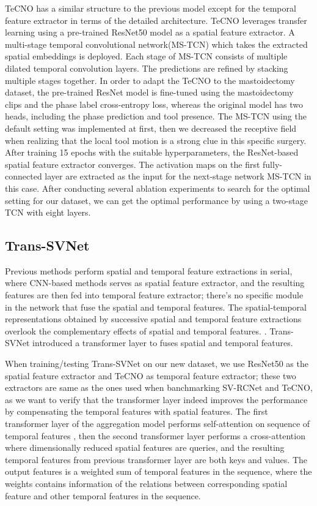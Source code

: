 \documentclass[11pt]{article} \usepackage[top=1in, bottom=1in, left=1in, right=1in]{geometry}
\begin{document}
\vspace{0.25cm}
\noindent
TeCNO has a similar structure to the previous model except for the temporal feature extractor in terms of the detailed architecture. TeCNO leverages transfer learning using a pre-trained ResNet50 model as a spatial feature extractor. A multi-stage temporal convolutional network(MS-TCN) which takes the extracted spatial embeddings is deployed. Each stage of MS-TCN consists of multiple dilated temporal convolution layers. The predictions are refined by stacking multiple stages together. In order to adapt the TeCNO to the mastoidectomy dataset, the pre-trained ResNet model is fine-tuned using the mastoidectomy clips and the phase label cross-entropy loss, whereas the original model has two heads, including the phase prediction and tool presence. The MS-TCN using the default setting was implemented at first, then we decreased the receptive field when realizing that the local tool motion is a strong clue in this specific surgery. After training 15 epochs with the suitable hyperparameters, the ResNet-based spatial feature extractor converges. The activation maps on the first fully-connected layer are extracted as the input for the next-stage network MS-TCN in this case. After conducting several ablation experiments to search for the optimal setting for our dataset, we can get the optimal performance by using a two-stage TCN with eight layers.

\subsection{Trans-SVNet}
Previous methods perform spatial and temporal feature extractions in serial, where CNN-based methods serves as spatial feature extractor, and the resulting features are then fed into temporal feature extractor; there's no specific module in the network that fuse the spatial and temporal features. The spatial-temporal representations obtained by successive spatial and temporal feature extractions overlook the complementary effects of spatial and temporal features. \cite{TransSVNet}. Trans-SVNet introduced a transformer layer to fuses spatial and temporal features.

\vspace{0.25cm}
\noindent
When training/testing Trans-SVNet on our new dataset, we use ResNet50 as the spatial feature extractor and TeCNO as temporal feature extractor; these two extractors are same as the ones used when banchmarking SV-RCNet and TeCNO, as we want to verify that the transformer layer indeed improves the performance by compensating the temporal features with spatial features. The first transformer layer of the aggregation model performs self-attention on sequence of temporal features , then the second transformer layer performs a cross-attention where dimensionally reduced spatial features are queries, and the resulting temporal features from previous transformer layer are both keys and values. The output features is a weighted sum of temporal features in the sequence, where the weights contains information of the relations between corresponding spatial feature and other temporal features in the sequence.
\end{document}
